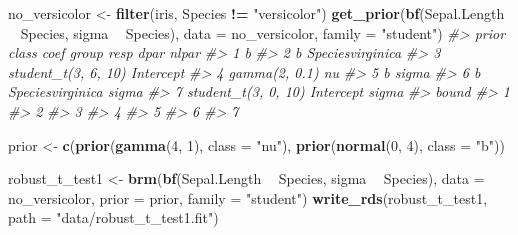\documentclass[]{book}
\newenvironment{Shaded}{\begin{snugshade}}{\end{snugshade}}
\newcommand{\CommentTok}[1]{\textcolor[rgb]{0.56,0.35,0.01}{\textit{#1}}}
\newcommand{\DataTypeTok}[1]{\textcolor[rgb]{0.13,0.29,0.53}{#1}}
\newcommand{\DecValTok}[1]{\textcolor[rgb]{0.00,0.00,0.81}{#1}}
\newcommand{\KeywordTok}[1]{\textcolor[rgb]{0.13,0.29,0.53}{\textbf{#1}}}
\newcommand{\NormalTok}[1]{#1}
\newcommand{\OperatorTok}[1]{\textcolor[rgb]{0.81,0.36,0.00}{\textbf{#1}}}
\newcommand{\StringTok}[1]{\textcolor[rgb]{0.31,0.60,0.02}{#1}}
\begin{document}
\begin{Shaded}
\begin{Highlighting}[]
\NormalTok{no_versicolor <-}\StringTok{ }\KeywordTok{filter}\NormalTok{(iris, Species }\OperatorTok{!=}\StringTok{ "versicolor"}\NormalTok{)}
\KeywordTok{get_prior}\NormalTok{(}\KeywordTok{bf}\NormalTok{(Sepal.Length }\OperatorTok{~}\StringTok{ }\NormalTok{Species, sigma }\OperatorTok{~}\StringTok{ }\NormalTok{Species), }
          \DataTypeTok{data =}\NormalTok{ no_versicolor, }
          \DataTypeTok{family =} \StringTok{"student"}\NormalTok{)}
\CommentTok{#>                 prior     class             coef group resp  dpar nlpar}
\CommentTok{#> 1                             b                                        }
\CommentTok{#> 2                             b Speciesvirginica                       }
\CommentTok{#> 3 student_t(3, 6, 10) Intercept                                        }
\CommentTok{#> 4       gamma(2, 0.1)        nu                                        }
\CommentTok{#> 5                             b                             sigma      }
\CommentTok{#> 6                             b Speciesvirginica            sigma      }
\CommentTok{#> 7 student_t(3, 0, 10) Intercept                             sigma      }
\CommentTok{#>   bound}
\CommentTok{#> 1      }
\CommentTok{#> 2      }
\CommentTok{#> 3      }
\CommentTok{#> 4      }
\CommentTok{#> 5      }
\CommentTok{#> 6      }
\CommentTok{#> 7}
\end{Highlighting}
\end{Shaded}

\begin{Shaded}
\begin{Highlighting}[]
\NormalTok{prior <-}\StringTok{ }\KeywordTok{c}\NormalTok{(}\KeywordTok{prior}\NormalTok{(}\KeywordTok{gamma}\NormalTok{(}\DecValTok{4}\NormalTok{, }\DecValTok{1}\NormalTok{), }\DataTypeTok{class =} \StringTok{"nu"}\NormalTok{),}
           \KeywordTok{prior}\NormalTok{(}\KeywordTok{normal}\NormalTok{(}\DecValTok{0}\NormalTok{, }\DecValTok{4}\NormalTok{), }\DataTypeTok{class =} \StringTok{"b"}\NormalTok{))}
\end{Highlighting}
\end{Shaded}

\begin{Shaded}
\begin{Highlighting}[]
\NormalTok{robust_t_test1 <-}\StringTok{ }\KeywordTok{brm}\NormalTok{(}\KeywordTok{bf}\NormalTok{(Sepal.Length }\OperatorTok{~}\StringTok{ }\NormalTok{Species, sigma }\OperatorTok{~}\StringTok{ }\NormalTok{Species), }
            \DataTypeTok{data =}\NormalTok{ no_versicolor, }
            \DataTypeTok{prior =}\NormalTok{ prior, }
            \DataTypeTok{family =} \StringTok{"student"}\NormalTok{)}
\KeywordTok{write_rds}\NormalTok{(robust_t_test1, }\DataTypeTok{path =} \StringTok{"data/robust_t_test1.fit"}\NormalTok{)}
\end{Highlighting}
\end{Shaded}
\end{document}
